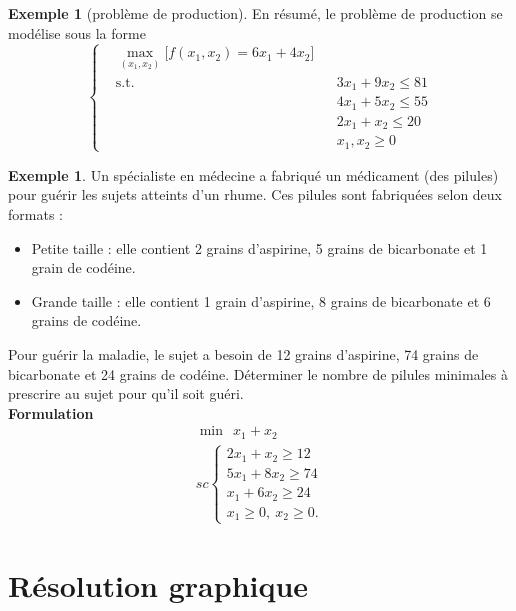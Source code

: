 \documentclass[a4paper,12pt,openany]{book}
\theoremstyle{plain}
\theoremstyle{definition}
\newtheorem{exemple}[theorem]{Exemple}
\theoremstyle{remark}
\theoremstyle{nbstyle}
\begin{document}
\begin{exemple}[problème de production]
		En résumé, le problème de production se modélise sous la forme
		\begin{equation}
		\left\{
		\begin{aligned}
		& \displaystyle\max_{(x_1,x_2)} \Big[f(x_1,x_2) = 6x_1 + 4x_2\Big] \\
		& \text{s.t. } && 3x_1 + 9x_2 \le 81 \\
		&      && 4x_1 + 5x_2 \le 55 \\
		&      && 2x_1 + x_2 \le 20 \\
		&      && x_1, x_2 \ge 0
		\end{aligned}
		\right.
		\end{equation}
	\end{exemple}
	
	\begin{exemple}
		Un spécialiste en médecine a fabriqué un médicament (des pilules) pour guérir les sujets atteints d’un rhume. Ces pilules sont fabriquées selon deux formats :
		\begin{itemize}
			\item[$\diamond $] Petite taille : elle contient 2 grains d’aspirine, 5 grains de bicarbonate et 1 grain de codéine.
			\item[$\diamond $] Grande taille : elle contient 1 grain d’aspirine, 8 grains de bicarbonate et 6 grains de codéine.
		\end{itemize}
		Pour guérir la maladie, le sujet a besoin de 12 grains d’aspirine, 74 grains de bicarbonate et 24 grains de codéine. Déterminer le nombre de pilules minimales à prescrire au sujet pour qu’il soit guéri.\\
		
		\textbf{Formulation}
		\begin{equation}\label{key}
		\begin{array}{lc}
		\displaystyle\min\:\:x_{1}+x_{2}  \\
		sc \left\lbrace \begin{array}{llc}
		2x_{1}+x_{2}\geq12 \\
		5x_{1}+8x_{2}\geq74\\
		x_{1}+6x_{2}\geq24 \\
		x_{1}\geq0,\: x_{2}\geq0.
		\end{array}\right.
		\end{array}
		\end{equation}
	\end{exemple}
	
	\chapter{Résolution graphique}
	
\end{document}
